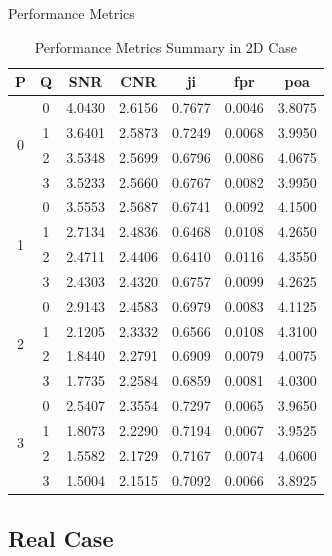 \documentclass{beamer}
\begin{document}
\begin{frame}{Performance Metrics}
\begin{table}
\centering
\caption{Performance Metrics Summary in 2D Case}
\begin{tabular}{ccccccc}
\hline
\textbf{P} & \textbf{Q} & \textbf{SNR} & \textbf{CNR} & \gls{ji} & \gls{fpr} & \gls{poa} \\ \hline
\multirow{4}{*}{0} & 0 & 4.0430 & 2.6156 & 0.7677 & 0.0046 & 3.8075 \\
 & 1 & 3.6401 & 2.5873 & 0.7249 & 0.0068 & 3.9950 \\
 & 2 & 3.5348 & 2.5699 & 0.6796 & 0.0086 & 4.0675 \\
 & 3 & 3.5233 & 2.5660 & 0.6767 & 0.0082 & 3.9950 \\ \hline
\multirow{4}{*}{1} & 0 & 3.5553 & 2.5687 & 0.6741 & 0.0092 & 4.1500 \\
 & 1 & 2.7134 & 2.4836 & 0.6468 & 0.0108 & 4.2650 \\
 & 2 & 2.4711 & 2.4406 & 0.6410 & 0.0116 & 4.3550 \\
 & 3 & 2.4303 & 2.4320 & 0.6757 & 0.0099 & 4.2625 \\ \hline
\multirow{4}{*}{2} & 0 & 2.9143 & 2.4583 & 0.6979 & 0.0083 & 4.1125 \\
 & 1 & 2.1205 & 2.3332 & 0.6566 & 0.0108 & 4.3100 \\
 & 2 & 1.8440 & 2.2791 & 0.6909 & 0.0079 & 4.0075 \\
 & 3 & 1.7735 & 2.2584 & 0.6859 & 0.0081 & 4.0300 \\ \hline
\multirow{4}{*}{3} & 0 & 2.5407 & 2.3554 & 0.7297 & 0.0065 & 3.9650 \\
 & 1 & 1.8073 & 2.2290 & 0.7194 & 0.0067 & 3.9525 \\
 & 2 & 1.5582 & 2.1729 & 0.7167 & 0.0074 & 4.0600 \\
 & 3 & 1.5004 & 2.1515 & 0.7092 & 0.0066 & 3.8925 \\ \hline
\end{tabular}
\end{table}
\end{frame}

\subsection{Real Case}
\end{document}
